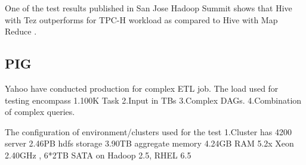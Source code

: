 \documentclass[9pt,twocolumn,twoside]{../../styles/osajnl}
\begin{document}
 \begin{figure}[htbp]
 \centering
 \caption{\cite{www-tez.org}}
 \label{Reference:false-color}
 \end{figure}
 
 One of the test results published in San Jose Hadoop Summit shows that Hive with Tez outperforms for TPC-H workload as compared
 to Hive with Map Reduce \cite{www-hivetest1}.
 
 \subsection{PIG}
 
 Yahoo have conducted production for complex ETL job.   The load used for testing encompass
 1.100K Task
 2.Input in TBs
 3.Complex DAGs.
 4.Combination of complex queries.

 The configuration of  environment/clusters used for the test
 1.Cluster has 4200 server 
 2.46PB hdfs storage
 3.90TB aggregate memory
 4.24GB RAM
 5.2x Xeon 2.40GHz , 6*2TB SATA on Hadoop 2.5, RHEL 6.5

 \begin{figure}[htbp]
 \centering
 \caption{\cite{www-tez.org}}
 \label{Reference:false-color}
 \end{figure}
\end{document}
